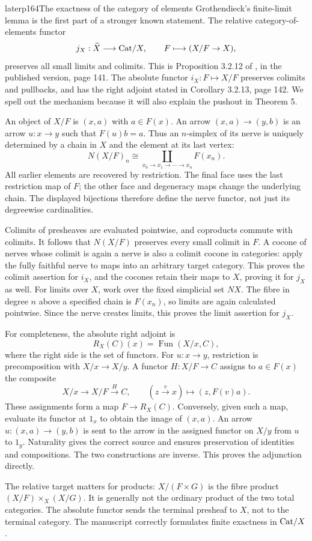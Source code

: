 \begin{dcomment}{later}{p164}{The exactness of the category of elements}
Grothendieck's finite-limit lemma is the first part of a stronger known statement. The relative category-of-elements functor
\[
             j_X:\widehat X\longrightarrow\mathrm{Cat}/X,
             \qquad F\longmapsto (X/F\to X),
\]
preserves all small limits and colimits. This is Proposition 3.2.12 of \citet{Cisinski2006}, in the published version, page 141. The absolute functor $i_X:F\mapsto X/F$ preserves colimits and pullbacks, and has the right adjoint stated in Corollary 3.2.13, page 142. We spell out the mechanism because it will also explain the pushout in Theorem 5.

An object of $X/F$ is $(x,a)$ with $a\in F(x)$. An arrow $(x,a)\to(y,b)$ is an arrow $u:x\to y$ such that $F(u)b=a$. Thus an $n$-simplex of its nerve is uniquely determined by a chain in $X$ and the element at its last vertex:
\[
 N(X/F)_n\cong
       \coprod_{x_0\to x_1\to\cdots\to x_n} F(x_n).
\]
All earlier elements are recovered by restriction. The final face uses the last restriction map of $F$; the other face and degeneracy maps change the underlying chain. The displayed bijections therefore define the nerve functor, not just its degreewise cardinalities.

Colimits of presheaves are evaluated pointwise, and coproducts commute with colimits. It follows that $N(X/F)$ preserves every small colimit in $F$. A cocone of nerves whose colimit is again a nerve is also a colimit cocone in categories: apply the fully faithful nerve to maps into an arbitrary target category. This proves the colimit assertion for $i_X$, and the cocones retain their maps to $X$, proving it for $j_X$ as well. For limits over $X$, work over the fixed simplicial set $NX$. The fibre in degree $n$ above a specified chain is $F(x_n)$, so limits are again calculated pointwise. Since the nerve creates limits, this proves the limit assertion for $j_X$.

For completeness, the absolute right adjoint is
\[
       R_X(C)(x)=\operatorname{Fun}(X/x,C),
\]
where the right side is the set of functors. For $u:x\to y$, restriction is precomposition with $X/x\to X/y$. A functor $H:X/F\to C$ assigns to $a\in F(x)$ the composite
\[
 X/x\longrightarrow X/F\xrightarrow{H}C,
 \qquad (z\xrightarrow{v}x)\longmapsto(z,F(v)a).
\]
These assignments form a map $F\to R_X(C)$. Conversely, given such a map, evaluate its functor at $1_x$ to obtain the image of $(x,a)$. An arrow $u:(x,a)\to(y,b)$ is sent to the arrow in the assigned functor on $X/y$ from $u$ to $1_y$. Naturality gives the correct source and ensures preservation of identities and compositions. The two constructions are inverse. This proves the adjunction directly.

The relative target matters for products: $X/(F\times G)$ is the fibre product $(X/F)\times_X(X/G)$. It is generally not the ordinary product of the two total categories. The absolute functor sends the terminal presheaf to $X$, not to the terminal category. The manuscript correctly formulates finite exactness in $\mathrm{Cat}/X$.
\end{dcomment}


